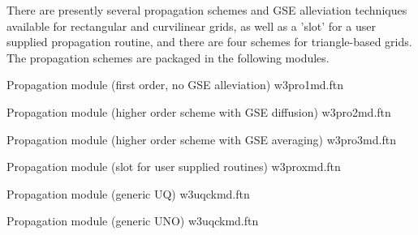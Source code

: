 \noindent
There are presently several propagation schemes and GSE alleviation techniques
available for rectangular and curvilinear grids, as well as a 'slot' for a
user supplied propagation routine, and there are four schemes for
triangle-based grids. The propagation schemes are packaged in the following
modules.

\vspace{\baselineskip} \noindent
Propagation module (first order, no GSE alleviation) \hfill {\file w3pro1md.ftn}

\begin{flisti}
\end{flisti}

\noindent
Propagation module (higher order scheme with GSE diffusion) \hfill {\file
  w3pro2md.ftn}

\begin{flisti}
\end{flisti}

\noindent
Propagation module (higher order scheme with GSE averaging) \hfill {\file
  w3pro3md.ftn}

\begin{flisti}
\end{flisti}

\noindent
Propagation module (slot for user supplied routines) \hfill {\file
w3proxmd.ftn}

\begin{flisti}
\end{flisti}

\noindent
Propagation module (generic UQ) \hfill {\file w3uqckmd.ftn}

\begin{flisti}
\end{flisti}

\noindent
Propagation module (generic UNO) \hfill {\file w3uqckmd.ftn}

